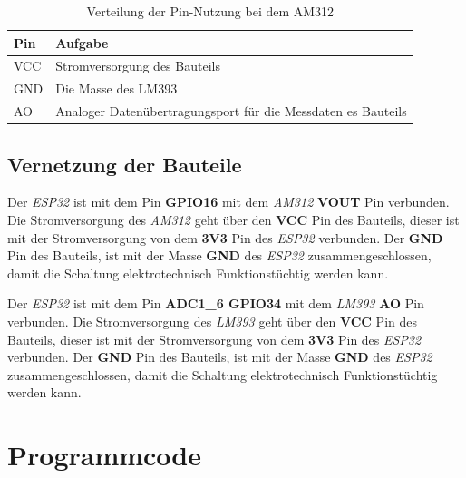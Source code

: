 \documentclass[9pt,a4paper]{report}
\begin{document}
	\renewcommand{\arraystretch}{1.5}
	\begin{table}[h!] %
		\centering %
		\caption{Verteilung der Pin-Nutzung bei dem AM312} %
		\label{tab:teil_2_steckbrett_lm393} %
		\begin{tabular}{|l|l|} %
			\hline
			Pin & Aufgabe \\
			\hline
			VCC & Stromversorgung des Bauteils \\
			GND & Die Masse des LM393 \\
			AO & Analoger Datenübertragungsport für die Messdaten es Bauteils \\
			\hline %
		\end{tabular}
	\end{table}
	\renewcommand{\arraystretch}{1}
	\subsection{Vernetzung der Bauteile}
	Der \textit{ESP32} ist mit dem Pin \textbf{GPIO16} mit dem \textit{AM312} \textbf{VOUT} Pin verbunden.
	Die Stromversorgung des \textit{AM312} geht über den \textbf{VCC} Pin des Bauteils, dieser ist mit der Stromversorgung von dem \textbf{3V3} Pin des \textit{ESP32} verbunden.
	Der \textbf{GND} Pin des Bauteils, ist mit der Masse \textbf{GND} des \textit{ESP32} zusammengeschlossen, damit die Schaltung elektrotechnisch Funktionstüchtig werden kann.
	
	Der \textit{ESP32} ist mit dem Pin \textbf{ADC1\_6 GPIO34} mit dem \textit{LM393} \textbf{AO} Pin verbunden.
	Die Stromversorgung des \textit{LM393} geht über den \textbf{VCC} Pin des Bauteils, dieser ist mit der Stromversorgung von dem \textbf{3V3} Pin des \textit{ESP32} verbunden.
	Der \textbf{GND} Pin des Bauteils, ist mit der Masse \textbf{GND} des \textit{ESP32} zusammengeschlossen, damit die Schaltung elektrotechnisch Funktionstüchtig werden kann.
	\newpage
	\section{Programmcode}	
\end{document}
